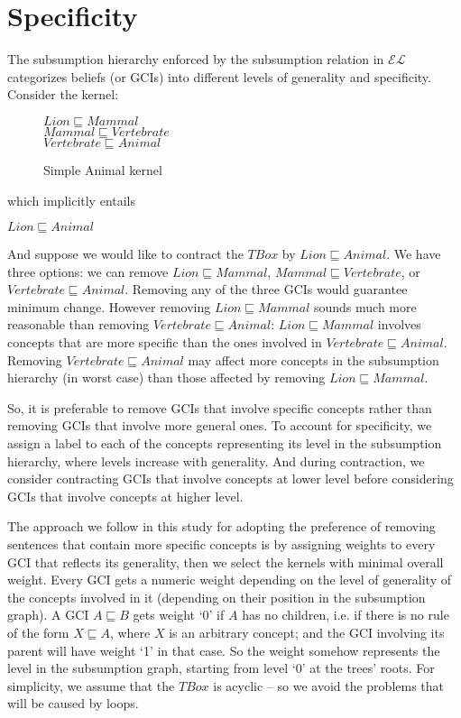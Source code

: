 \section{Specificity}

The subsumption hierarchy enforced by the subsumption relation in $\mathcal{EL}$ categorizes beliefs (or GCIs) into different levels of generality and specificity. Consider the kernel:%
\begin{figure}[h]
\begin{center}
$Lion \sqsubseteq Mammal$\\
$Mammal \sqsubseteq Vertebrate$\\
$Vertebrate \sqsubseteq Animal$
\end{center}
\caption{Simple Animal kernel}
\label{fig:AnimalKernel}
\end{figure}

which implicitly entails
\begin{center}
$Lion \sqsubseteq Animal$
\end{center}
And suppose we would like to contract the $TBox$ by $Lion \sqsubseteq Animal$. We have three options: we can remove $Lion \sqsubseteq Mammal$, $Mammal \sqsubseteq Vertebrate$, or $Vertebrate \sqsubseteq Animal$. Removing any of the three GCIs would guarantee minimum change. However removing $Lion \sqsubseteq Mammal$ sounds much more reasonable than removing $Vertebrate \sqsubseteq Animal$: $Lion \sqsubseteq Mammal$ involves concepts that are more specific than the ones involved in $Vertebrate \sqsubseteq Animal$. Removing $Vertebrate \sqsubseteq Animal$ may affect more concepts in the subsumption hierarchy (in worst case) than those affected by removing $Lion \sqsubseteq Mammal$. 

So, it is preferable to remove GCIs that involve specific concepts rather than removing GCIs that involve more general ones. To account for specificity, we assign a label to each of the concepts representing its level in the subsumption hierarchy, where levels increase with generality. And during contraction, we consider contracting GCIs that involve concepts at lower level before considering GCIs that involve concepts at higher level.

The approach we follow in this study for adopting the preference of removing sentences that contain more specific concepts is by assigning weights to every GCI that reflects its generality, then we select the kernels with minimal overall weight. Every GCI gets a numeric weight depending on the level of generality of the concepts involved in it (depending on their position in the subsumption graph). A GCI $A \sqsubseteq B$ gets weight `0' if $A$ has no children, i.e. if there is no rule of the form $X \sqsubseteq A$, where $X$ is an arbitrary concept; and the GCI involving its parent will have weight `1' in that case. So the weight somehow represents the level in the subsumption graph, starting from level `0' at the trees' roots. For simplicity, we assume that the $TBox$ is acyclic -- so we avoid the problems that will be caused by loops.


